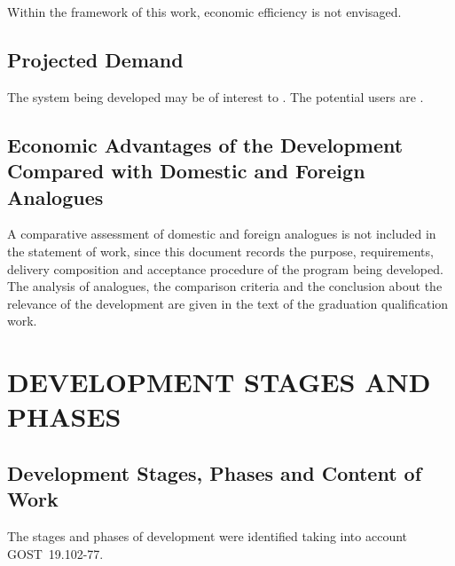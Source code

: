 \documentclass[12pt,a4paper]{extarticle}
\begin{document}
Within the framework of this work, economic efficiency is not envisaged.

\subsection{Projected Demand}

The system being developed may be of interest to . The potential users are .

\subsection{Economic Advantages of the Development Compared with Domestic and Foreign Analogues}

A comparative assessment of domestic and foreign analogues is not included in the statement of work, since this document records the purpose, requirements, delivery composition and acceptance procedure of the program being developed. The analysis of analogues, the comparison criteria and the conclusion about the relevance of the development are given in the text of the graduation qualification work.

\clearpage

\section{DEVELOPMENT STAGES AND PHASES}

\subsection{Development Stages, Phases and Content of Work}

The stages and phases of development were identified taking into account GOST~19.102-77\cite{gost19102}.
\end{document}
